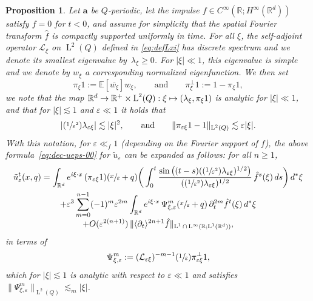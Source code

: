 \documentclass[10pt]{amsart}
\newcommand{\Psfrac}[2]{(\sfrac{#1}{#2})}
\newcommand\mto{\mathchoice{\longmapsto}{\mapsto}{\mapsto}{\mapsto}}
\theoremstyle{plain}
\newtheorem{prop0}[theor0]{Proposition}
\newenvironment{prop}
{\renewcommand{\qedsymbol}{$\lozenge$}\pushQED{\qed}\begin{prop0}}
{\popQED\end{prop0}}
\theoremstyle{definition}
\numberwithin{equation}{section}
\newcommand{\e}{\varepsilon}
\newcommand{\Lc}{\mathcal{L}}
\newcommand{\R}{\mathbb R}
\newcommand{\Aa}{\boldsymbol a}
\newcommand{\Ld}{\operatorname{L}}
\newcommand{\expec}[1]{\mathbb{E}\left[ #1 \right]}
\begin{document}
\begin{prop}\label{prop:Bloch}
Let $\Aa$ be $Q$-periodic, let the impulse $f\in C^\infty(\R;H^\infty(\R^d))$ satisfy $f=0$ for $t<0$, and assume for simplicity that the spatial Fourier transform $\hat f$ is compactly supported uniformly in time. For all $\xi$, the self-adjoint operator $\Lc_\xi$ on $\Ld^2(Q)$ {defined in \eqref{eq:defLxi}} has discrete spectrum and we denote its smallest eigenvalue by~$\lambda_\xi\ge0$. For $|\xi|\ll1$, this eigenvalue is simple and we denote by $w_\xi$ a corresponding normalized eigenfunction.
We then set\vspace*{-3pt}
\begin{equation}\label{eq:defin-pi-ibot}
\pi_\xi1:=\expec{\overline{w_\xi}}w_\xi,\qquad\text{and}\qquad\pi_\xi^\bot1:=1-\pi_\xi1,
\end{equation}
we note that the map $\R^d\to\R^+\times\Ld^2( Q):\xi\mto (\lambda_\xi,\pi_\xi1)$ is analytic for $|\xi|\ll1$, and that for $|\xi|\lesssim1$ and $\e\ll1$ {it holds that}\vspace*{-3pt}
\begin{equation}\label{eq:prop-lam-pi-eps}
|\Psfrac1{\e^2}\lambda_{\e\xi}|\lesssim|\xi|^2,\qquad\text{and}\qquad\|\pi_{\e\xi}1-1\|_{\Ld^2( Q)}\lesssim\e|\xi|.
\end{equation}
With this notation, for $\e\ll_f1$ (depending on the Fourier support of $f$), the above formula~\eqref{eq:dec-ueps-00} for $\tilde u_\e$ can be expanded as follows: for all $n\ge1$,\vspace*{-3pt}
\begin{multline}\label{eq:full-decomp-per-u}
\tilde u_\e^t(x,q)=\int_{\R^d}e^{i\xi\cdot x}\,(\pi_{\e\xi}1)(\sfrac x\e+q)\bigg(\int_0^t\frac{\sin\big((t-s)(\Psfrac1{\e^2}\lambda_{\e \xi})^{1/2}\big)}{(\Psfrac1{\e^2}\lambda_{\e \xi})^{1/2}}\,\hat f^s(\xi)\,ds\bigg)\,d^*\xi\\
+\e^3\sum_{m=0}^{n-1}(-1)^m\e^{2m}\int_{\R^d}e^{i\xi\cdot x}\,\Psi_{\xi,\e}^m(\sfrac x\e+q)\,\partial_t^{2m}\hat f^t(\xi)\,d^*\xi\\[-3pt]
+O(\e^{2(n+1)})\,\|\langle\partial_t\rangle^{2n+1}\hat f\|_{\Ld^1\cap\Ld^\infty(\R;\Ld^1(\R^d))},
\end{multline}
in terms of\vspace*{-3pt}
\begin{equation}\label{eq:defin-Psi-0}
\Psi_{\xi,\e}^m:=(\Lc_{\e\xi})^{-m-1}\Psfrac1\e\pi_{\e\xi}^\bot1,
\end{equation}
which for $|\xi|\lesssim1$ is analytic with respect to $\e\ll1$ and satisfies
$\|\Psi_{\xi,\e}^m\|_{\Ld^2(Q)}\lesssim_m|\xi|$.
\end{prop}
\end{document}
